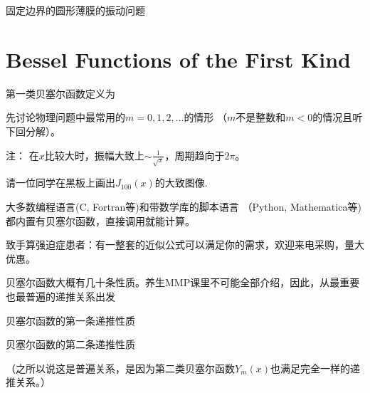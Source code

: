 \documentclass[CJK]{beamer}
\date{}
\begin{document}

\begin{frame}
\bch
\bitem
\item{固定边界的圆形薄膜的振动问题}    
\eitem
\ech
\end{frame}

\section{Bessel Functions of the First Kind}

\begin{frame}
  \bch
  第一类贝塞尔函数定义为

  先讨论物理问题中最常用的$m=0,1,2,\ldots$的情形 （$m$不是整数和$m<0$的情况且听下回分解）。

  \ech
\end{frame}


\begin{frame}
  \bch
  \ech
\end{frame}


\begin{frame}
  \bch
 注： 在$x$比较大时，振幅大致上$\sim \frac{1}{\sqrt{x}}$，周期趋向于$2\pi$。
  \ech
\end{frame}


\begin{frame}
  \bch
  请一位同学在黑板上画出$J_{100}(x)$的大致图像.
  \ech
\end{frame}



\begin{frame}
  \bch
  大多数编程语言(C, Fortran等)和带数学库的脚本语言 （Python, Mathematica等)都内置有贝塞尔函数，直接调用就能计算。

    \skiplines
    
  致手算强迫症患者\huaixiao：有一整套的近似公式可以满足你的需求，欢迎来电采购，量大优惠。
  \ech
\end{frame}


\begin{frame}
  \bch
  贝塞尔函数大概有几十条性质。养生MMP课里不可能全部介绍，因此，从最重要也最普遍的递推关系出发

  {\blue 贝塞尔函数的第一条递推性质}

  {\blue 贝塞尔函数的第二条递推性质}

  （之所以说这是普遍关系，是因为第二类贝塞尔函数$Y_m(x)$也满足完全一样的递推关系。）
  \ech
\end{frame}
\end{document}
